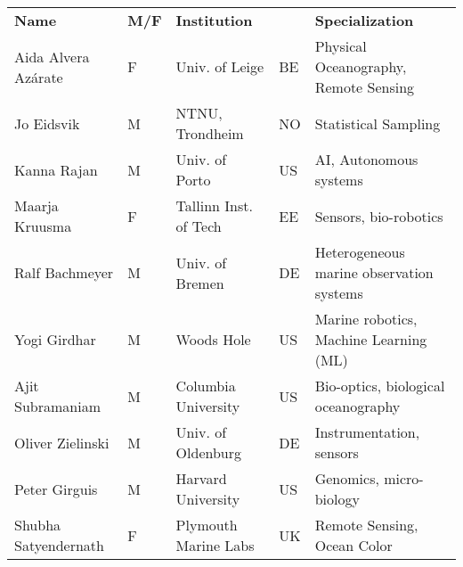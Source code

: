 \begin{table}[!t]
  \footnotesize{
\begin{tabular}{|p{3.5cm}|p{0.7cm}|p{4.0cm}|p{0.5cm}|p{6.0cm}|}
  \rowcolor{Gray}
  \bfseries Name& \bfseries M/F&\bfseries Institution & & \bfseries Specialization\\
  Aida Alvera Az\'{a}rate    & F   & Univ. of Leige                        & BE       &Physical Oceanography, Remote Sensing\\
  \hline
  Jo Eidsvik               & M   & NTNU, Trondheim                                  & NO       & Statistical Sampling                            \\
  \hline
  Kanna Rajan              & M   & Univ. of Porto            & US       & AI, Autonomous systems           \\
  \hline
  Maarja Kruusma  & F   & Tallinn Inst. of Tech
                                                      & EE  & Sensors,
                                                              bio-robotics                                \\
  \hline
  Ralf Bachmeyer           & M   & Univ. of Bremen                       & DE       & Heterogeneous marine observation systems                        \\
  \hline
  Yogi Girdhar             & M   & Woods Hole
                                                      & US       &
                                                                   Marine
                                                                   robotics,
                                                                   Machine
                                                                   Learning
  (ML)\\
  \hline
  Ajit Subramaniam         & M   & Columbia University
                                                      & US       &
                                                                   Bio-optics, biological oceanography                        \\
  \hline
  Oliver Zielinski          & M   & Univ. of Oldenburg                   & DE       & Instrumentation, sensors                        \\
  \hline
  Peter Girguis            & M   & Harvard University                               & US       & Genomics, micro-biology                         \\
  \hline
  Shubha Satyendernath     & F   & Plymouth Marine Labs                  & UK       & Remote Sensing, Ocean Color                     \\

\end{tabular}}
\end{table}
